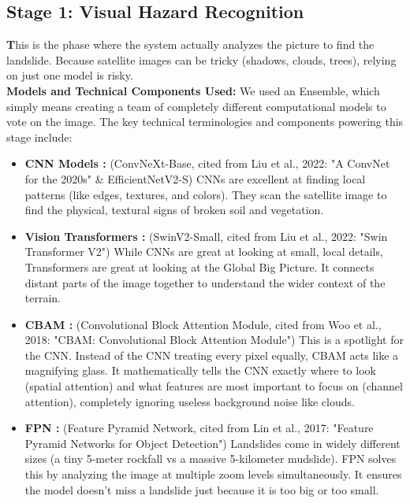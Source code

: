 \documentclass[11pt,a4paper]{article}
\begin{document}
\subsection{ Stage 1: Visual Hazard Recognition}
\textbf This is the phase where the system actually analyzes the picture to find the landslide. Because satellite images can be tricky (shadows, clouds, trees), relying on just one model is risky. \\
\textbf{Models and Technical Components Used:} We used an Ensemble, which simply means creating a team of completely different computational models to vote on the image. The key technical terminologies and components powering this stage include:
\begin{itemize}
    \item \textbf{CNN Models :} (ConvNeXt-Base, cited from Liu et al., 2022: "A ConvNet for the 2020s" \& EfficientNetV2-S) CNNs are excellent at finding local patterns (like edges, textures, and colors). They scan the satellite image to find the physical, textural signs of broken soil and vegetation.
    \item \textbf{Vision Transformers :} (SwinV2-Small, cited from Liu et al., 2022: "Swin Transformer V2") While CNNs are great at looking at small, local details, Transformers are great at looking at the Global Big Picture. It connects distant parts of the image together to understand the wider context of the terrain.
    \item \textbf{CBAM :} (Convolutional Block Attention Module, cited from Woo et al., 2018: "CBAM: Convolutional Block Attention Module") This is a spotlight for the CNN. Instead of the CNN treating every pixel equally, CBAM acts like a magnifying glass. It mathematically tells the CNN exactly where to look (spatial attention) and what features are most important to focus on (channel attention), completely ignoring useless background noise like clouds.
    \item \textbf{FPN :} (Feature Pyramid Network, cited from Lin et al., 2017: "Feature Pyramid Networks for Object Detection") Landslides come in widely different sizes (a tiny 5-meter rockfall vs a massive 5-kilometer mudslide). FPN solves this by analyzing the image at multiple zoom levels simultaneously. It ensures the model doesn't miss a landslide just because it is too big or too small.
\end{itemize}
\end{document}
